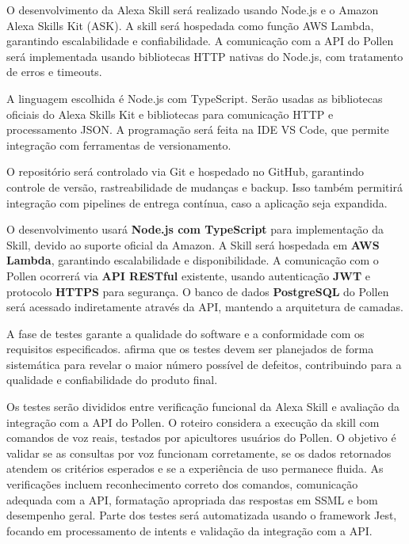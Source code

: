 O desenvolvimento da Alexa Skill será realizado usando Node.js e o Amazon Alexa Skills Kit (ASK). A skill será hospedada como função AWS Lambda, garantindo escalabilidade e confiabilidade. A comunicação com a API do Pollen será implementada usando bibliotecas HTTP nativas do Node.js, com tratamento de erros e timeouts.

A linguagem escolhida é Node.js com TypeScript. Serão usadas as bibliotecas oficiais do Alexa Skills Kit e bibliotecas para comunicação HTTP e processamento JSON. A programação será feita na IDE VS Code, que permite integração com ferramentas de versionamento.

O repositório será controlado via Git e hospedado no GitHub, garantindo controle de versão, rastreabilidade de mudanças e backup. Isso também permitirá integração com pipelines de entrega contínua, caso a aplicação seja expandida.

\label{sssec:tecnologias}

O desenvolvimento usará \textbf{Node.js com TypeScript} para implementação da Skill, devido ao suporte oficial da Amazon. A Skill será hospedada em \textbf{AWS Lambda}, garantindo escalabilidade e disponibilidade. A comunicação com o Pollen ocorrerá via \textbf{API RESTful} existente, usando autenticação \textbf{JWT} e protocolo \textbf{HTTPS} para segurança. O banco de dados \textbf{PostgreSQL} do Pollen será acessado indiretamente através da API, mantendo a arquitetura de camadas.

\label{sssec:testes}

A fase de testes garante a qualidade do software e a conformidade com os requisitos especificados. \textcite{pressman2011} afirma que os testes devem ser planejados de forma sistemática para revelar o maior número possível de defeitos, contribuindo para a qualidade e confiabilidade do produto final.

Os testes serão divididos entre verificação funcional da Alexa Skill e avaliação da integração com a API do Pollen. O roteiro considera a execução da skill com comandos de voz reais, testados por apicultores usuários do Pollen. O objetivo é validar se as consultas por voz funcionam corretamente, se os dados retornados atendem os critérios esperados e se a experiência de uso permanece fluida. As verificações incluem reconhecimento correto dos comandos, comunicação adequada com a API, formatação apropriada das respostas em SSML e bom desempenho geral. Parte dos testes será automatizada usando o framework Jest, focando em processamento de intents e validação da integração com a API.

